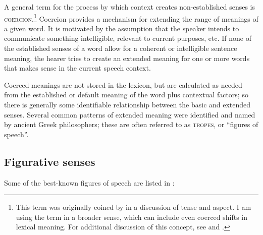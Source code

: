 A general term for the process by which context creates non-established senses is \textsc{coercion}.\footnote{This term was originally coined by \citet{MoensSteedman1988}  in a discussion of tense and aspect. I am using the term in a broader sense, which can include even coerced shifts in lexical meaning. For additional discussion of this concept, see \citet{Pustejovsky1995} and \citet{deSwart1998}. } Coercion provides a mechanism for extending the range of meanings of a given word. It is motivated by the assumption that the speaker intends to communicate something intelligible, relevant to current purposes, etc. If none of the established senses of a word allow for a coherent or intelligible sentence meaning, the hearer tries to create an extended meaning for one or more words that makes sense in the current speech context.



Coerced meanings are not stored in the lexicon, but are calculated as needed from the established or default meaning of the word plus contextual factors; so there is generally some identifiable relationship between the basic and extended senses. Several common patterns of extended meaning were identified and named by ancient  {Greek} philosophers; these are often referred to as \textsc{tropes}, or “figures of speech”.


\subsection{Figurative senses}\label{sec:5.4.1}

Some of the best-known figures of speech are listed in :

